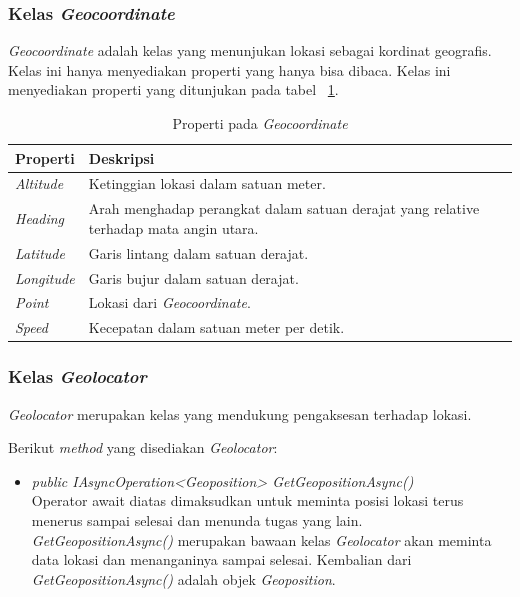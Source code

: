 \subsubsection{Kelas \textit{Geocoordinate}}
\label{subsubsec:Kelas Geocoordinate}
\hspace{0.5cm} \textit{Geocoordinate} adalah kelas yang menunjukan lokasi sebagai kordinat geografis. Kelas ini hanya menyediakan properti yang hanya bisa dibaca. Kelas ini menyediakan properti yang ditunjukan pada tabel ~\ref{tab:PropertiPadaKelasGeocoordinate}.

\begin{table}[h]
	\centering
		\begin{tabular}{ |p{4cm}|p{10cm}|}
				\hline
				Properti & Deskripsi \\ \hline
				\textit{Altitude} & Ketinggian lokasi dalam satuan meter. \\ \hline
				\textit{Heading} & Arah menghadap perangkat dalam satuan derajat yang relative terhadap mata angin utara. \\ \hline
				\textit{Latitude} & Garis lintang dalam satuan derajat. \\ \hline
				\textit{Longitude}  & Garis bujur dalam satuan derajat. \\ \hline
				\textit{Point} & Lokasi dari \textit{Geocoordinate}. \\ \hline
				\textit{Speed} & Kecepatan dalam satuan meter per detik. \\ \hline
				\hline
		\end{tabular}
	\caption{Properti pada \textit{Geocoordinate}}
	\label{tab:PropertiPadaKelasGeocoordinate}
\end{table} 

\subsubsection{Kelas \textit{Geolocator}}
\label{subsubsec:Kelas Geolocator}
\hspace{0.5cm} \textit{Geolocator} merupakan kelas yang mendukung pengaksesan terhadap lokasi.

Berikut \textit{method} yang disediakan \textit{Geolocator}:
\begin{itemize}
	\item \textit{public IAsyncOperation<Geoposition> GetGeopositionAsync()} \\
		Operator await diatas dimaksudkan untuk meminta posisi lokasi terus menerus sampai selesai dan menunda tugas yang lain. \\
		\textit{GetGeopositionAsync()} merupakan bawaan kelas \textit{Geolocator} akan meminta data lokasi dan menanganinya sampai selesai.
		Kembalian dari \textit{GetGeopositionAsync()} adalah objek \textit{Geoposition}.
\end{itemize}

